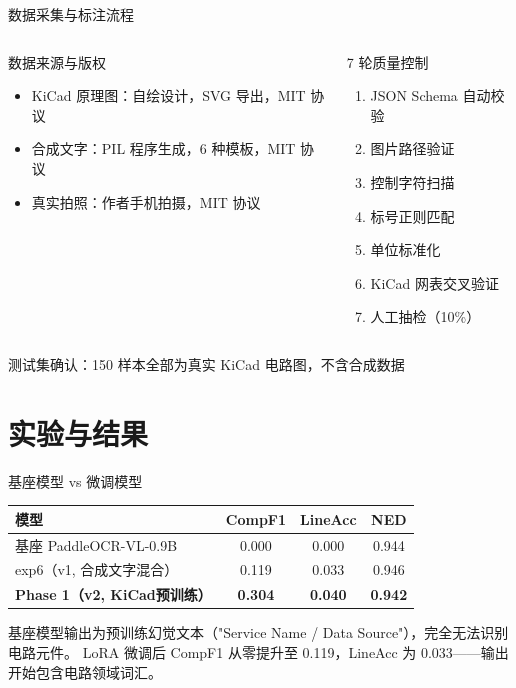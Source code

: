 \documentclass[10pt,aspectratio=169,table]{beamer}
\begin{document}
\begin{frame}{数据采集与标注流程}
  \begin{columns}[T]
      \begin{block}{数据来源与版权}
        \footnotesize
        \begin{itemize}
          \item KiCad 原理图：自绘设计，SVG 导出，MIT 协议
          \item 合成文字：PIL 程序生成，6 种模板，MIT 协议
          \item 真实拍照：作者手机拍摄，MIT 协议
        \end{itemize}
      \end{block}
      \begin{block}{7 轮质量控制}
        \footnotesize
        \begin{enumerate}
          \item JSON Schema 自动校验
          \item 图片路径验证
          \item 控制字符扫描
          \item 标号正则匹配
          \item 单位标准化
          \item KiCad 网表交叉验证
          \item 人工抽检（10\%）
        \end{enumerate}
      \end{block}
  \end{columns}
  \begin{center}
    \footnotesize 测试集确认：150 样本全部为真实 KiCad 电路图，不含合成数据
  \end{center}
\end{frame}

\section{实验与结果}

\begin{frame}{基座模型 vs 微调模型}
  \begin{table}
    \centering
    \footnotesize
    \begin{tabular}{lccc}
      \toprule
      \textbf{模型} & \textbf{CompF1} & \textbf{LineAcc} & \textbf{NED} \\
      \midrule
      基座 PaddleOCR-VL-0.9B & 0.000 & 0.000 & 0.944 \\
      exp6（v1, 合成文字混合）& 0.119 & 0.033 & 0.946 \\
      \textbf{Phase 1（v2, KiCad预训练）} & \textbf{0.304} & \textbf{0.040} & \textbf{0.942} \\
      \bottomrule
    \end{tabular}
  \end{table}
  \begin{block}{}
    \footnotesize
    基座模型输出为预训练幻觉文本（"Service Name / Data Source"），完全无法识别电路元件。
    LoRA 微调后 CompF1 从零提升至 0.119，LineAcc 为 0.033——输出开始包含电路领域词汇。
  \end{block}
\end{frame}
\end{document}
